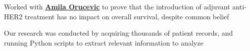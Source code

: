 \documentclass[letterpaper]{deedy-resume} %
\begin{document}
\begin{minipage}[t]{0.66\textwidth}
  \sectionspace %
  


  \begin{tightitemize}
  \item Worked with \textbf{\href{http://gsm.utmck.edu/pathology/faculty/orucevic.cfm}{Amila Orucevic}} to prove that the introduction of adjuvant anti-HER2 treatment has no impact on overall survival, despite common belief
  \item Our research was conducted by acquiring thousands of patient records, and running Python scripts to extract relevant information to analyze
  \end{tightitemize}

  \sectionspace %


%
%
%
%




\end{minipage}
\end{document}
